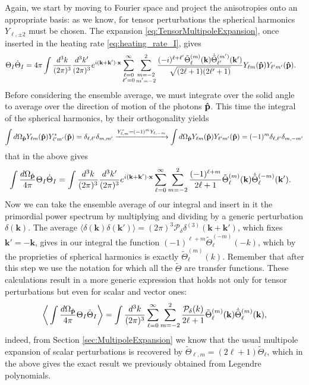 Again, we start by moving to Fourier space and project the anisotropies onto an appropriate basis: as we know, for tensor perturbations the spherical harmonics $Y_{\ell,\pm2}$ must be chosen. The expansion \eqref{eq:TensorMultipoleExpansion}, once inserted in the heating rate \eqref{eq:heating_rate_I}, gives
\begin{align*}
    \Theta_I\dot \Theta_I&=4\pi\int\frac{d^3k}{(2\pi)^3}\frac{d^3k'}{(2\pi)^3}e^{i(\mathbf{k}+\mathbf{k}')\cdot\mathbf{x}}\sum_{\substack{\ell=0\\\ell'=0}}^{\infty}\sum_{\substack{m=-2\\m'=-2}}^{2}\frac{(-i)^{\ell+\ell'}\tilde\Theta_\ell^{(m)}(\mathbf{k})\dot{\tilde\Theta}_{\ell'}^{(m')}(\mathbf{k}')}{\sqrt{(2\ell+1)(2\ell'+1)}}Y_{\ell m}(\mathbf{\hat{p}})Y_{\ell' m'}(\mathbf{\hat{p}}).
\end{align*}
Before considering the ensemble average, we must integrate over the solid angle to average over the direction of motion of the photons $\mathbf{\hat{p}}$. This time the integral of the spherical harmonics, by their orthogonality yields
$$\int d\Omega_{\mathbf{\hat{p}}} Y_{\ell m}(\mathbf{\hat{p}})Y^*_{\ell' m'}(\mathbf{\hat{p}})=\delta_{\ell, \ell'}\delta_{m,m'} \xrightarrow{Y^*_{\ell, m}=(-1)^mY_{\ell, -m}} \int d\Omega_{\mathbf{\hat{p}}} Y_{\ell m}(\mathbf{\hat{p}})Y_{\ell' m'}(\mathbf{\hat{p}})=(-1)^m\delta_{\ell, \ell'}\delta_{m,-m'}$$ 
that in the above gives
\begin{align*}
    \int\frac{d\Omega_{\mathbf{\hat{p}}}}{4\pi}\Theta_I\dot \Theta_I&=\int\frac{d^3k}{(2\pi)^3}\frac{d^3k'}{(2\pi)^3}e^{i(\mathbf{k}+\mathbf{k}')\cdot\mathbf{x}}\sum_{\ell=0}^{\infty}\sum_{m=-2}^{2}\frac{(-1)^{\ell+m}}{2\ell+1}\tilde\Theta_\ell^{(m)}(\mathbf{k})\dot{\tilde\Theta}_{\ell}^{(-m)}(\mathbf{k}').
\end{align*}
Now we can take the ensemble average of our integral and insert in it the primordial power spectrum by multiplying and dividing by a generic perturbation $\delta(\mathbf{k})$. The average $\langle\delta(\mathbf{k})\delta(\mathbf{k}')\rangle=(2\pi)^3\mathcal{P}_\delta\delta^{(3)}(\mathbf{k}+\mathbf{k}')$, which fixes $\mathbf{k}'=-\mathbf{k}$, gives in our integral the function $(-1)^{\ell+m}\tilde\Theta_\ell^{(-m)}(-k)$, which by the proprieties of spherical harmonics is exactly $\tilde \Theta_\ell^{(m)}(k)$.  Remember that after this step we use the notation for which all the $\tilde\Theta$ are transfer functions. These calculations result in a more generic expression that holds not only for tensor perturbations but even for scalar and vector ones:
\begin{equation}
    \bigg\langle\int\frac{d\Omega_{\mathbf{\hat{p}}}}{4\pi}\Theta_I\dot \Theta_I\bigg\rangle=\int\frac{d^3k}{(2\pi)^3}\sum_{\ell=0}^{\infty}\sum_{m=-2}^{2}\frac{\mathcal{P}_\delta (k)}{2\ell+1}\tilde\Theta_\ell^{(m)}(\mathbf{k})\dot{\tilde\Theta}_{\ell}^{(m)}(\mathbf{k}),\label{eq:I_heating_rate_general}
\end{equation} 
indeed, from Section \ref{sec:MultipoleExpansion} we know that the usual multipole expansion of scalar perturbations is recovered by $\tilde\Theta_{\ell,m}=(2\ell+1)\tilde\Theta_\ell$, which in the above gives the exact result we previously obtained from Legendre polynomials.

